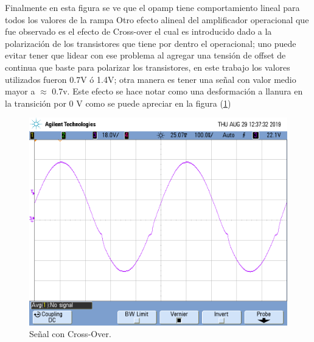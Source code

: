 Finalmente en esta figura se ve que el opamp tiene comportamiento lineal para todos los valores de la rampa
Otro efecto alineal del amplificador operacional que fue observado es el efecto de Cross-over el cual es introducido dado a la polarización de los transistores que tiene por dentro el operacional; uno puede evitar tener que lidear con ese problema al agregar una tensión de offset de continua que baste para polarizar los transistores, en este trabajo los valores utilizados fueron 0.7V ó 1.4V; otra manera es tener una señal con valor medio mayor a $\approx$ 0.7v. Este efecto se hace notar como una desformación a llanura en la transición por 0 V como  se puede apreciar en la figura (\ref{fig:co})
\begin{figure}[H]	
	\centering
	\includegraphics[width=\textwidth]{Ejercicio1/Imagenes/CrossOver.png}
	\caption{Señal con Cross-Over.}
	\label{fig:co}
\end{figure} 

